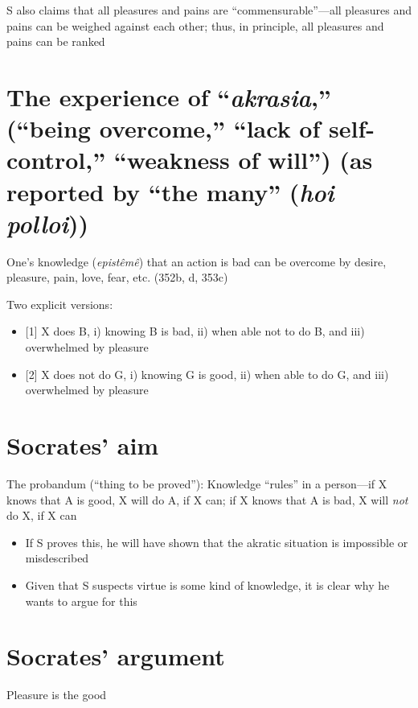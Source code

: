 \documentclass[11pt]{article}
\begin{document}
\noindent S also claims that all pleasures and pains are ``commensurable''---all pleasures and pains can be weighed against each other; thus, in principle, all pleasures and pains can be ranked

\section*{The experience of ``\emph{akrasia},'' (``being overcome,'' ``lack of self-control,'' ``weakness of will'') (as reported by ``the many'' (\emph{hoi polloi}))}

\noindent One's knowledge (\emph{epist\^{e}m\^{e}}) that an action is bad can be overcome by desire, pleasure, pain, love, fear, etc. (352b, d, 353c)
\vspace*{2mm}

\noindent Two explicit versions:

\begin{itemize}\item{[1] X does B, i) knowing B is bad, ii) when able not to do B, and iii) overwhelmed by pleasure}
\item{[2] X does not do G, i) knowing G is good, ii) when able to do G, and iii) overwhelmed by pleasure}\end{itemize}

\section*{Socrates' aim}

\noindent The probandum (``thing to be proved''): Knowledge ``rules'' in a person---if X knows that A is good, X will do A, if X can; if X knows that A is bad, X will \emph{not} do X, if X can

\begin{itemize}\item{If S proves this, he will have shown that the akratic situation is impossible or misdescribed}

\item{Given that S suspects virtue is some kind of knowledge, it is clear why he wants to argue for this}\end{itemize}

\section*{Socrates' argument}

\noindent [P1] Pleasure is the good
\vspace*{2mm}
\end{document}
